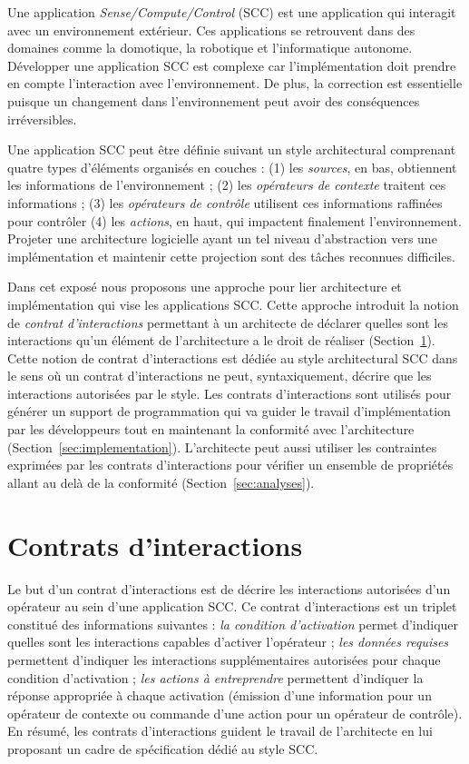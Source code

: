 \documentclass{llncs}
\begin{document}
Une application \emph{Sense/Compute/Control} (SCC) est une application
qui interagit avec un environnement extérieur. Ces applications se
retrouvent dans des domaines comme la domotique, la robotique et
l'informatique autonome. Développer une application SCC est complexe
car l'implémentation doit prendre en compte l'interaction avec
l'environnement. De plus, la correction est essentielle puisque un
changement dans l'environnement peut avoir des conséquences
irréversibles.

Une application SCC peut être définie suivant un style architectural
comprenant quatre types d'éléments organisés en couches : (1) les
\emph{sources}, en bas, obtiennent les informations de l'environnement
; (2) les \emph{opérateurs de contexte} traitent ces informations ;
(3) les \emph{opérateurs de contrôle} utilisent ces informations
raffinées pour contrôler (4) les \emph{actions}, en haut, qui
impactent finalement l'environnement. Projeter une architecture
logicielle ayant un tel niveau d'abstraction vers une implémentation
et maintenir cette projection sont des tâches reconnues difficiles.

Dans cet exposé nous proposons une approche pour lier architecture et
implémentation qui vise les applications SCC. Cette approche introduit
la notion de \emph{contrat d'interactions} permettant à un architecte
de déclarer quelles sont les interactions qu'un élément de
l'architecture a le droit de réaliser (Section~\ref{sec:contrats}).
Cette notion de contrat d'interactions est dédiée au style
architectural SCC dans le sens où un contrat d'interactions ne peut,
syntaxiquement, décrire que les interactions autorisées par le style.
Les contrats d'interactions sont utilisés pour générer un support de
programmation qui va guider le travail d'implémentation par les
développeurs tout en maintenant la conformité avec l'architecture
(Section~\ref{sec:implementation}). L'architecte peut aussi utiliser
les contraintes exprimées par les contrats d'interactions pour
vérifier un ensemble de propriétés allant au delà de la conformité
(Section~\ref{sec:analyses}).

\section{Contrats d'interactions}
\label{sec:contrats}

Le but d'un contrat d'interactions est de décrire les interactions
autorisées d'un opérateur au sein d'une application SCC. Ce contrat
d'interactions est un triplet constitué des informations suivantes :
\emph{la condition d'activation} permet d'indiquer quelles sont les
interactions capables d'activer l'opérateur ; \emph{les données
  requises} permettent d'indiquer les interactions supplémentaires
autorisées pour chaque condition d'activation ; \emph{les actions à
  entreprendre} permettent d'indiquer la réponse appropriée à chaque
activation (émission d'une information pour un opérateur de contexte
ou commande d'une action pour un opérateur de contrôle). En résumé,
les contrats d'interactions guident le travail de l'architecte en
lui proposant un cadre de spécification dédié au style SCC.
\end{document}
